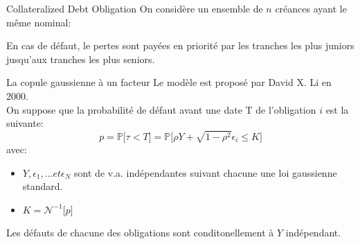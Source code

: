 \documentclass{beamer}
\begin{document}
\begin{frame}{Collateralized Debt Obligation}
On considère un ensemble de $n$ créances ayant le même nominal:\\
\vspace{0.5cm}
\begin{center}
\end{center}
En cas de défaut, le pertes sont payées en priorité par les tranches les plus juniors jusqu'aux tranches les plus seniors.
\end{frame}

\begin{frame}{La copule gaussienne à un facteur}
Le modèle est proposé par David X. Li en 2000.\\
\vspace{0.5cm}
On suppose que la probabilité de défaut avant une date T de l'obligation $i$ est la suivante:\\
\[
p=\mathbb{P}\big[\tau < T\big]=\mathbb{P}\big[\rho Y + \sqrt{1-\rho^2} \epsilon_i \leq K\big]
\]
avec:
\begin{itemize}
\item $Y, \epsilon_1, ... et \epsilon_N$ sont de v.a. indépendantes suivant chacune une loi gaussienne standard.\\
\item $K = \mathcal{N}^{-1}\big[p\big]$\\
\end{itemize}
\vspace{0.5cm}
Les défauts de chacune des obligations sont conditonellement à $Y$ indépendant.
\end{frame}
\end{document}
